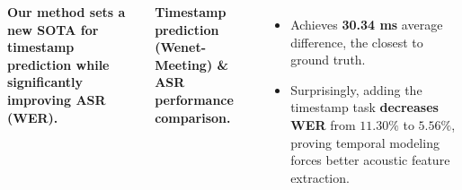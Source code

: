 \documentclass[25pt, a0paper, portrait]{tikzposter}
\newcommand{\techicon}{%
\raisebox{-0.1em}{\shortstack[c]{%
\textcolor{red!75!black}{\normalsize$\bullet$}\\[-0.1ex]
\textcolor{orange!80!black}{\normalsize$\bullet$}\\[-0.1ex]
\textcolor{green!60!black}{\normalsize$\bullet$}}}%
\hspace{0.28em}%
}
\begin{document}
\begin{columns}
{            \textbf{Our method sets a new SOTA for timestamp prediction while significantly improving ASR (WER).}
            
                \textcolor{TechPurple}{\textbf{Timestamp prediction (Wenet-Meeting) \& ASR performance comparison.}}
                \vspace{0.35cm}
                \centering
                {\scriptsize
                \setlength{\tabcolsep}{4pt}
                \renewcommand{\arraystretch}{1.15}
                }
            
            \vspace{0.5cm}
            \begin{itemize}
                \item Achieves \textbf{30.34 ms} average difference, the closest to ground truth.
                \item Surprisingly, adding the timestamp task \textbf{decreases WER} from $11.30\%$ to $5.56\%$, proving temporal modeling forces better acoustic feature extraction.
            \end{itemize}
        }
        
            
            

\end{columns}
\end{document}
